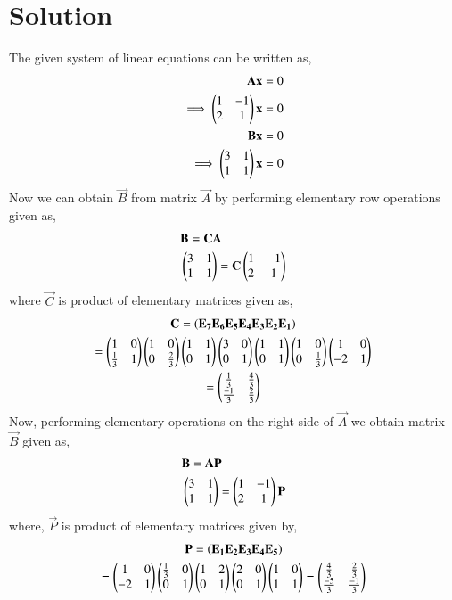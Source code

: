 \documentclass[journal,12pt,twocolumn]{IEEEtran}
\begin{document}
\section{Solution}
The given system of linear equations can be written as,   
\begin{align}
    \mathbf{A}\mathbf{x} &= 0 \\
    \implies\begin{pmatrix}1&-1\\2&1\end{pmatrix}\mathbf{x} &= 0 \label{ax=0}\\
    \mathbf{B}\mathbf{x} &= 0 \\
    \implies\begin{pmatrix}3&1\\1&1\end{pmatrix}\mathbf{x} &= 0 \label{bx=0}
\end{align}
Now we can obtain $\vec{B}$ from matrix $\vec{A}$ by performing elementary row operations given as, 
\begin{align}
    &\mathbf{B} = \mathbf{C}\mathbf{A} \label{b=ca}\\
    &\begin{pmatrix}3&1\\1&1\end{pmatrix} = \mathbf{C}\begin{pmatrix}1&-1\\2&1\end{pmatrix} \label{eq:ca}
\end{align}
where $\vec{C}$ is product of elementary matrices given as, 
\begin{multline}
    \mathbf{C} = \left(\mathbf{E_7}\mathbf{E_6}\mathbf{E_5}\mathbf{E_4}\mathbf{E_3}\mathbf{E_2}\mathbf{E_1}\right)\\
    =\begin{pmatrix}1&0\\\frac{1}{3}&1\end{pmatrix}\begin{pmatrix}1&0\\0&\frac{2}{3}\end{pmatrix}\begin{pmatrix}1&1\\0&1\end{pmatrix}\begin{pmatrix}3&0\\0&1\end{pmatrix}\begin{pmatrix}1&1\\0&1\end{pmatrix}\begin{pmatrix}1&0\\0&\frac{1}{3}\end{pmatrix}\begin{pmatrix}1&0\\-2&1\end{pmatrix} \\
    =\begin{pmatrix}\frac{1}{3}&\frac{4}{3} \\ \frac{-1}{3}&\frac{2}{3}\end{pmatrix}
\end{multline}
Now, performing elementary operations on the right side of $\vec{A}$ we obtain matrix $\vec{B}$ given as, 
\begin{align}
    &\mathbf{B} = \mathbf{A}\mathbf{P} \label{b=ap}\\
    &\begin{pmatrix}3&1\\1&1\end{pmatrix} = \begin{pmatrix}1&-1\\2&1\end{pmatrix}\mathbf{P}
\end{align}
where, $\vec{P}$ is product of elementary matrices given by, 
\begin{multline}
    \mathbf{P} = \left(\mathbf{E_1}\mathbf{E_2}\mathbf{E_3}\mathbf{E_4}\mathbf{E_5}\right)\\
    =\begin{pmatrix}1&0\\-2&1\end{pmatrix}\begin{pmatrix}\frac{1}{3}&0\\0&1\end{pmatrix}\begin{pmatrix}1&2\\0&1\end{pmatrix}\begin{pmatrix}2&0\\0&1\end{pmatrix}\begin{pmatrix}1&0\\1&1\end{pmatrix}
    = \begin{pmatrix}\frac{4}{3}&\frac{2}{3}\\ \frac{-5}{3}&\frac{-1}{3}\end{pmatrix}
\end{multline}
\end{document}
